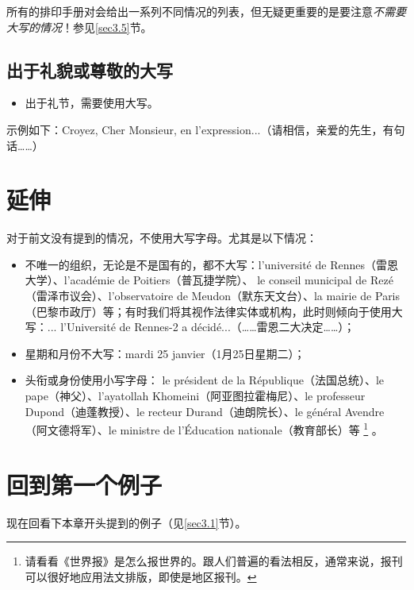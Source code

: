 所有的排印手册对会给出一系列不同情况的列表，但无疑更重要的是要注意\emph{不需要大写的情况}！参见\ref{sec3.5}节。

\subsection{出于礼貌或尊敬的大写}

\begin{itemize}
    \item 出于礼节，需要使用大写。
\end{itemize}

示例如下：Croyez, Cher Monsieur, en l'expression...（请相信，亲爱的先生，有句话……）

\section{延伸}

对于前文没有提到的情况，不使用大写字母。尤其是以下情况：

\begin{itemize}
    \item 不唯一的组织，无论是不是国有的，都不大写：l'université de Rennes（雷恩大学）、l'académie de Poitiers（普瓦捷学院）、 le conseil municipal de Rezé（雷泽市议会）、l'observatoire de Meudon（默东天文台）、la mairie de Paris（巴黎市政厅）等；有时我们将其视作法律实体或机构，此时则倾向于使用大写：... l'Université de Rennes-2 a décidé...（……雷恩二大决定……）；
    \item 星期和月份不大写：mardi 25 janvier（1月25日星期二）；
    \item 头衔或身份使用小写字母： le président de la République（法国总统）、le pape（神父）、l'ayatollah Khomeini（阿亚图拉霍梅尼）、le professeur Dupond（迪蓬教授）、le recteur Durand（迪朗院长）、le général Avendre（阿文德将军）、le ministre de l'Éducation nationale（教育部长）等
        \footnote{请看看《世界报》是怎么报世界的。跟人们普遍的看法相反，通常来说，报刊可以很好地应用法文排版，即使是地区报刊。}
    。
\end{itemize}

\section{回到第一个例子}

现在回看下本章开头提到的例子（见\ref{sec3.1}节）。

